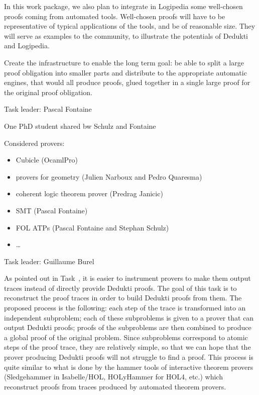 \begin{workpackage}[id=atpetc,wphases=0-48,type=RTD,
  short=ATPs etc.,%
  title={ATP, SAT, SMT, Model checkers},
  lead=Lie,
  LieRM=10]
\begin{wpdescription}
In this work package, we also plan to integrate in Logipedia some
well-chosen proofs coming from automated tools.  Well-chosen proofs
will have to be representative of typical applications of the tools,
and be of reasonable size.  They will serve as examples to the
community, to illustrate the potentials of Dedukti and Logipedia.


Create the infrastructure to enable the long term goal: be able to split a large proof
obligation into smaller parts and distribute to the appropriate automatic engines, that
would all produce proofs, glued together in a single large proof for the original proof
obligation.
\end{wpdescription}


\begin{tasklist}
\begin{task}[id=instrumenting, title=Instrumenting ATPs to produce
  traces]
  Task leader: Pascal Fontaine

  One PhD student shared bw Schulz and Fontaine
  
Considered provers:
\begin{itemize}
\item Cubicle (OcamlPro)
\item provers for geometry (Julien Narboux and Pedro Quaresma)
\item coherent logic theorem prover (Predrag Janicic)
\item SMT (Pascal Fontaine)
\item FOL ATPs (Pascal Fontaine and Stephan Schulz)
\item \dots
\end{itemize}

\end{task}


\begin{task}[id=tracetodedukti, title=Translate ATP traces into Dedukti]
  Task leader: Guillaume Burel

As pointed out in Task~, it is easier to
instrument provers to make them output traces instead of directly
provide Dedukti proofs. The goal of this task is to reconstruct the
proof traces in order to build Dedukti proofs from them. The proposed
process is the following: each step of the trace is transformed into
an independent subproblem; each of these subproblems is given to a
prover that can output Dedukti proofs; proofs of the subproblems are
then combined to produce a global proof of the original problem. Since
subproblems correspond to atomic steps of the proof trace, they are
relatively simple, so that we can hope that the prover producing
Dedukti proofs will not struggle to find a proof. This process is
quite similar to what is done by the hammer tools of interactive
theorem provers (Sledgehammer in Isabelle/HOL, HOLyHammer for HOL4, etc.)
which reconstruct proofs from traces produced by automated theorem
provers.


\end{task}
\end{tasklist}
\end{workpackage}
